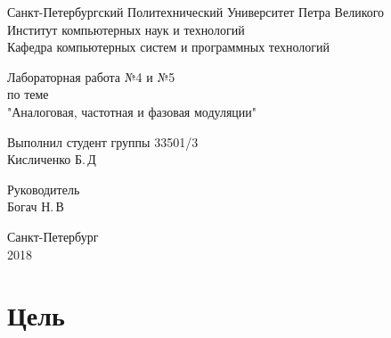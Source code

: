 \documentclass[12pt,a4paper]{scrartcl}
\begin{document}
\begin{titlepage}
  \begin{center}
    Санкт-Петербургский Политехнический Университет     Петра Великого \\
    
    Институт компьютерных наук и технологий \\
    
    Кафедра компьютерных систем и программных технологий
  \end{center}
  
  \vfill
  
  \begin{center}
  Лабораторная работа №4 и №5\\
  по теме\\
  "Аналоговая, частотная и фазовая модуляции"\\
\end{center}

\vfill

\newlength{\ML}
\hfill\begin{minipage}{0.4\textwidth}
  Выполнил студент группы 33501/3\\
  \underline{\hspace{\ML}} Кисличенко Б.\,Д\\
\end{minipage}%

\bigskip

\hfill\begin{minipage}{0.4\textwidth}
  Руководитель\\
  \underline{\hspace{\ML}} Богач Н.\,В\\
\end{minipage}%

\vfill
 
\begin{center}
  Санкт-Петербург\\
2018 
\end{center}

\end{titlepage}

\section{Цель}
\label{sec:goal}
\end{document}
